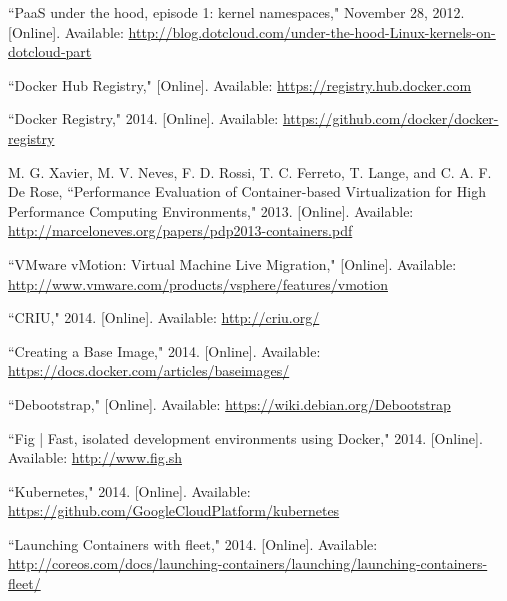 \documentclass[\myfontsize, letterpaper]{article}
\begin{document}
\begin{thebibliography}{99}

``PaaS under the hood, episode 1: kernel namespaces," November 28, 2012. [Online]. Available: \href{http://blog.dotcloud.com/under-the-hood-Linux-kernels-on-dotcloud-part}{http://blog.dotcloud.com/under-the-hood-Linux-kernels-on-dotcloud-part}

``Docker Hub Registry," [Online]. Available: \href{https://registry.hub.docker.com}{https://registry.hub.docker.com}

``Docker Registry," 2014. [Online]. Available: \href{https://github.com/docker/docker-registry}{https://github.com/docker/docker-registry}

M. G. Xavier, M. V. Neves, F. D. Rossi, T. C. Ferreto, T. Lange, and C. A. F. De Rose, ``Performance Evaluation of Container-based Virtualization for High Performance Computing Environments," 2013. [Online]. Available: \href{http://marceloneves.org/papers/pdp2013-containers.pdf}{http://marceloneves.org/papers/pdp2013-containers.pdf}

``VMware vMotion: Virtual Machine Live Migration," [Online]. Available: \href{http://www.vmware.com/products/vsphere/features/vmotion}{http://www.vmware.com/products/vsphere/features/vmotion}

``CRIU," 2014. [Online]. Available: \href{http://criu.org/}{http://criu.org/}

``Creating a Base Image," 2014. [Online]. Available: \href{https://docs.docker.com/articles/baseimages/}{https://docs.docker.com/articles/baseimages/}

``Debootstrap," [Online]. Available: \href{https://wiki.debian.org/Debootstrap}{https://wiki.debian.org/Debootstrap}

``Fig | Fast, isolated development environments using Docker," 2014. [Online]. Available: \href{http://www.fig.sh}{http://www.fig.sh}

``Kubernetes," 2014. [Online]. Available: \href{https://github.com/GoogleCloudPlatform/kubernetes}{https://github.com/GoogleCloudPlatform/kubernetes}

``Launching Containers with fleet," 2014. [Online]. Available: \href{http://coreos.com/docs/launching-containers/launching/launching-containers-fleet/}{http://coreos.com/docs/launching-containers/launching/launching-containers-fleet/}



\end{thebibliography}
\end{document}
